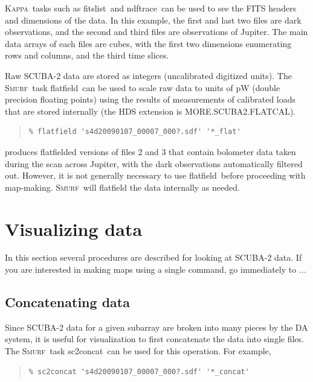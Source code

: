 \documentclass[twoside,11pt]{article}
\newenvironment{myquote}{\begin{quote}\begin{small}}{\end{small}\end{quote}}
\newcommand{\Kappa}{\xref{\textsc{Kappa}}{sun95}{}}
\newcommand{\smurf}{\xref{\textsc{Smurf}}{sun258}{}}
\newcommand{\task}[1]{\textsf{#1}}
\newcommand{\concat}{\xref{\task{sc2concat}}{sun258}{SC2CONCAT}}
\newcommand{\flatfield}{\xref{\task{flatfield}}{sun258}{FLATFIELD}}
\newcommand{\fitslist}{\xref{\task{fitslist}}{sun95}{FITSLIST}}
\newcommand{\ndftrace}{\xref{\task{ndftrace}}{sun95}{NDFTRACE}}
\newcommand{\xref}[3]{#1}
\newcommand{\xlabel}[1]{}
\renewcommand{\_}{\texttt{\symbol{95}}}
\begin{document}
\Kappa\ tasks such as \fitslist\ and \ndftrace\ can be used to see the
FITS headers and dimensions of the data. In this example, the first
and last two files are dark observations, and the second and third
files are observations of Jupiter. The main data arrays of each files
are cubes, with the first two dimensions enumerating rows and columns,
and the third time slices.

Raw SCUBA-2 data are stored as integers (uncalibrated digitized
units). The \smurf\ task \flatfield\ can be used to scale raw data to
units of pW (double precision floating points) using the results of
measurements of calibrated loads that are stored internally (the HDS
extension is MORE.SCUBA2.FLATCAL).

\begin{myquote}
\begin{verbatim}
% flatfield 's4d20090107_00007_000?.sdf' '*_flat'
\end{verbatim}
\end{myquote}

produces flatfielded versions of files 2 and 3 that contain bolometer
data taken during the scan across Jupiter, with the dark observations
automatically filtered out. However, it is not generally necessary to
use \flatfield\ before proceeding with map-making. \smurf\ will
flatfield the data internally as needed.

\section{\xlabel{time_series}Visualizing data}

In this section several procedures are described for looking at
SCUBA-2 data. If you are interested in making maps using a single command,
go immediately to ...

\subsection{\xlabel{concat}Concatenating data} 

Since SCUBA-2 data for a given subarray are broken into many pieces by
the DA system, it is useful for visualization to first concatenate the
data into single files. The \smurf\ task \concat\ can be used for this
operation. For example,

\begin{myquote}
\begin{verbatim}
% sc2concat 's4d20090107_00007_000?.sdf' '*_concat' 
\end{verbatim}
\end{myquote}
\end{document}
